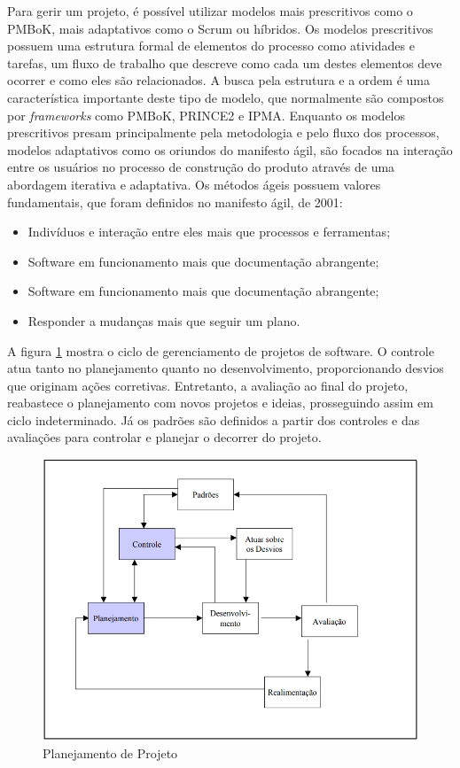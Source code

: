 Para gerir um projeto, é possível utilizar modelos mais prescritivos como o PMBoK, mais adaptativos como o Scrum ou híbridos.
Os modelos prescritivos possuem uma estrutura formal de elementos do processo como atividades e tarefas, um fluxo de trabalho que descreve como cada um destes elementos deve ocorrer e como eles são relacionados. A busca pela estrutura e a ordem é uma característica importante deste tipo de modelo, que normalmente são compostos por \textit{frameworks} como PMBoK, PRINCE2 e IPMA\cite{Julia_Mara_2018}.
Enquanto os modelos prescritivos presam principalmente pela metodologia e pelo fluxo dos processos, modelos adaptativos como os oriundos do manifesto ágil, são focados na interação entre os usuários no processo de construção do produto através de uma abordagem iterativa e adaptativa\cite{Julia_Mara_2018}.
Os métodos ágeis possuem valores fundamentais, que foram definidos no manifesto ágil, de 2001:
\begin{itemize}
	\item Indivíduos e interação entre eles mais que processos e ferramentas;
	\item Software em funcionamento mais que documentação abrangente;
	\item Software em funcionamento mais que documentação abrangente;
	\item Responder a mudanças mais que seguir um plano.
\end{itemize}

A figura \ref{planejamento_21} mostra o ciclo de gerenciamento de projetos de software. O controle atua tanto no planejamento quanto no desenvolvimento, proporcionando desvios que originam ações corretivas. Entretanto, a avaliação ao final do projeto, reabastece o planejamento com novos projetos e ideias, prosseguindo assim em ciclo indeterminado. Já os padrões são definidos a partir dos controles e das avaliações para controlar e planejar o decorrer do projeto.

\begin{figure}[htb]
	\caption{\label{planejamento_21}Planejamento de Projeto}
	\begin{center}
		\includegraphics[scale=0.45]{./Figuras/planejamento_projeto.png}
	\end{center}
\end{figure}

